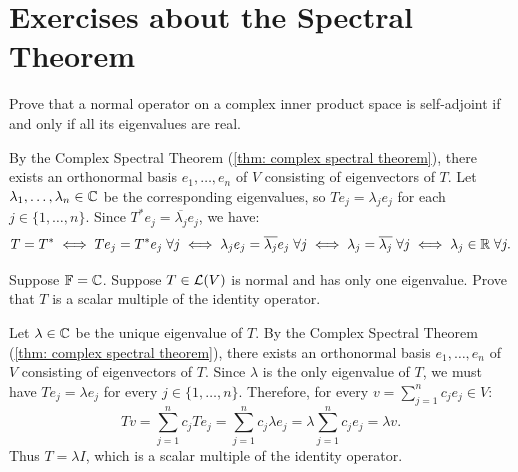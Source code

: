 \section*{Exercises about the Spectral Theorem}

\begin{xrcs}
  Prove that a normal operator on a complex inner product space is self-adjoint if and only if all its eigenvalues are real.

\begin{xprf}
  By the Complex Spectral Theorem (\ref{thm: complex spectral theorem}), there exists an orthonormal basis $e_1, \dots, e_n$ of $V$ consisting of eigenvectors of $T$.
  Let $\lambda_1, \dots, \lambda_n \in \mathbb{C}$ be the corresponding eigenvalues, so $T e_j = \lambda_j e_j$ for each $j \in \{1, \dots, n\}$.
  Since $T^* e_j = \overline{\lambda_j} e_j$, we have:
  \[
    T = T^* \iff T e_j = T^* e_j \;\forall j \iff \lambda_j e_j = \overline{\lambda_j} e_j \;\forall j \iff \lambda_j = \overline{\lambda_j} \;\forall j \iff \lambda_j \in \mathbb{R} \;\forall j.
  \]
\end{xprf}
\end{xrcs}

\begin{xrcs}
  Suppose $\mathbb{F} = \mathbb{C}$. Suppose $T \in \mathcal{L}(V)$ is normal and has only one eigenvalue. Prove that $T$ is a scalar multiple of the identity operator.

\begin{xprf}
  Let $\lambda \in \mathbb{C}$ be the unique eigenvalue of $T$.
  By the Complex Spectral Theorem (\ref{thm: complex spectral theorem}), there exists an orthonormal basis $e_1, \dots, e_n$ of $V$ consisting of eigenvectors of $T$.
  Since $\lambda$ is the only eigenvalue of $T$, we must have $T e_j = \lambda e_j$ for every $j \in \{1, \dots, n\}$.
  Therefore, for every $v = \sum_{j=1}^n c_j e_j \in V$:
  \[
    Tv = \sum_{j=1}^n c_j T e_j = \sum_{j=1}^n c_j \lambda e_j = \lambda \sum_{j=1}^n c_j e_j = \lambda v.
  \]
  Thus $T = \lambda I$, which is a scalar multiple of the identity operator.
\end{xprf}
\end{xrcs}

